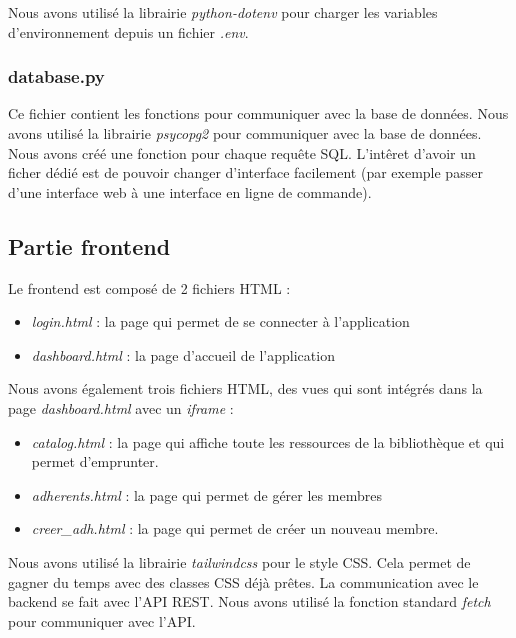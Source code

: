 \documentclass{report-UTC}
\begin{document}
Nous avons utilisé la librairie \textit{python-dotenv} pour charger les variables
d'environnement depuis un fichier \textit{.env}. 

\subsubsection{database.py}

Ce fichier contient les fonctions pour communiquer avec la base de données. Nous
avons utilisé la librairie \textit{psycopg2} pour communiquer avec la base de 
données. \\

Nous avons créé une fonction pour chaque requête SQL. L'intêret d'avoir 
un ficher dédié est de pouvoir changer d'interface facilement (par exemple
passer d'une interface web à une interface en ligne de commande). \\

\subsection{Partie frontend}

Le frontend est composé de 2 fichiers HTML :

\begin{itemize}

    \item \textit{login.html} : la page qui permet de se connecter à l'application
    \item \textit{dashboard.html} : la page d'accueil de l'application

\end{itemize}

Nous avons également trois fichiers HTML, des vues qui sont intégrés dans la 
page \textit{dashboard.html} avec un \textit{iframe} :

\begin{itemize}

    \item \textit{catalog.html} : la page qui affiche toute les ressources 
    de la bibliothèque et qui permet d'emprunter.
    \item \textit{adherents.html} : la page qui permet de gérer les membres
    \item \textit{creer\_adh.html} : la page qui permet de créer un nouveau
    membre.
\end{itemize}

Nous avons utilisé la librairie \textit{tailwindcss} pour le style CSS. Cela
permet de gagner du temps avec des classes CSS déjà prêtes. La communication
avec le backend se fait avec l'API REST. Nous avons utilisé la fonction
standard \textit{fetch} pour communiquer avec l'API. \\
\end{document}
